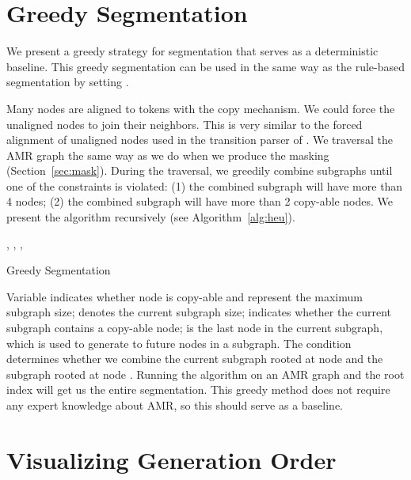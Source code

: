 \documentclass[11pt]{article}
\begin{document}
\section{Greedy Segmentation} \label{append:greedy}
We present a greedy strategy for segmentation that serves as a deterministic baseline. This greedy segmentation can be used in the same way as the rule-based segmentation by setting . 

Many nodes are aligned to tokens with the copy mechanism. We could force the unaligned nodes to join their neighbors. This is very similar to the forced alignment of unaligned nodes used in the transition parser of . 
We traversal the AMR graph the same way as we do when we produce the masking (Section~\ref{sec:mask}).  During the traversal, we greedily combine subgraphs until one of the constraints is violated: (1) the combined subgraph will have more than 4 nodes; (2) the combined subgraph will have more than 2 copy-able nodes. We present the algorithm recursively (see Algorithm~\ref{alg:heu}).
\begin{algorithm}[ht!] 
\SetAlgoLined
{}
\vspace{1ex}
  , , , \;
  \ForAll{}{
    \If { } {
     \;
        \;
        \If { } {
        , ,  \; 
        }
    }
}
 \caption{Greedy Segmentation \label{alg:heu}}
\end{algorithm}
Variable  indicates whether node  is copy-able and  represent the maximum subgraph size;  denotes the current subgraph size;   indicates whether the current subgraph contains a copy-able node;  is the last node in the current subgraph, which is used to generate to future nodes in a subgraph. The condition  determines whether we combine the current subgraph rooted at node  and the subgraph rooted at node . Running the algorithm on an AMR graph and the root index will get us the entire segmentation. This greedy method does not require any expert knowledge about AMR, so this should serve as a baseline. 




\section{Visualizing Generation Order}\label{append:seg_visual}
\end{document}
